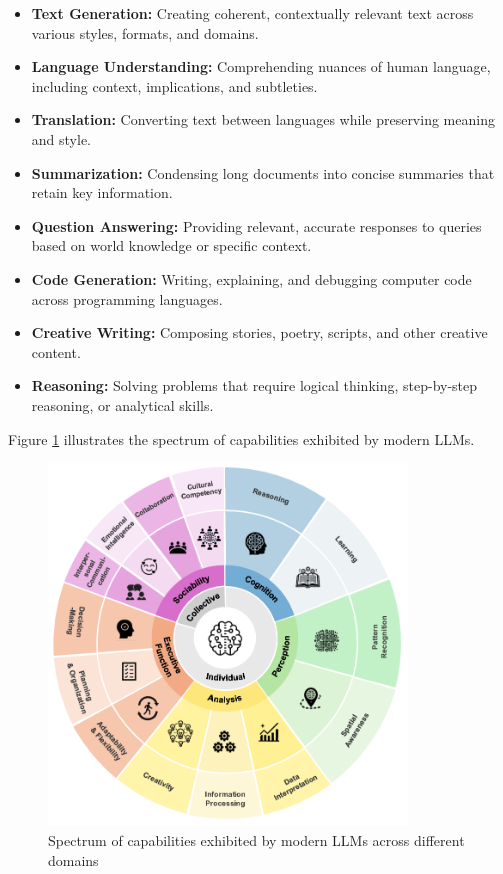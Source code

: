 \documentclass[11pt,a4paper]{report}
\begin{document}
\begin{itemize}
    \item \textbf{Text Generation:} Creating coherent, contextually relevant text across various styles, formats, and domains.
    
    \item \textbf{Language Understanding:} Comprehending nuances of human language, including context, implications, and subtleties.
    
    \item \textbf{Translation:} Converting text between languages while preserving meaning and style.
    
    \item \textbf{Summarization:} Condensing long documents into concise summaries that retain key information.
    
    \item \textbf{Question Answering:} Providing relevant, accurate responses to queries based on world knowledge or specific context.
    
    \item \textbf{Code Generation:} Writing, explaining, and debugging computer code across programming languages.
    
    \item \textbf{Creative Writing:} Composing stories, poetry, scripts, and other creative content.
    
    \item \textbf{Reasoning:} Solving problems that require logical thinking, step-by-step reasoning, or analytical skills.
\end{itemize}

Figure \ref{fig:llm-capabilities} illustrates the spectrum of capabilities exhibited by modern LLMs.

\begin{figure}[ht]
    \centering
    \includegraphics[width=0.85\textwidth]{llm_capabilities_spectrum.png}
    \caption{Spectrum of capabilities exhibited by modern LLMs across different domains}
    \label{fig:llm-capabilities}
\end{figure}
\end{document}
